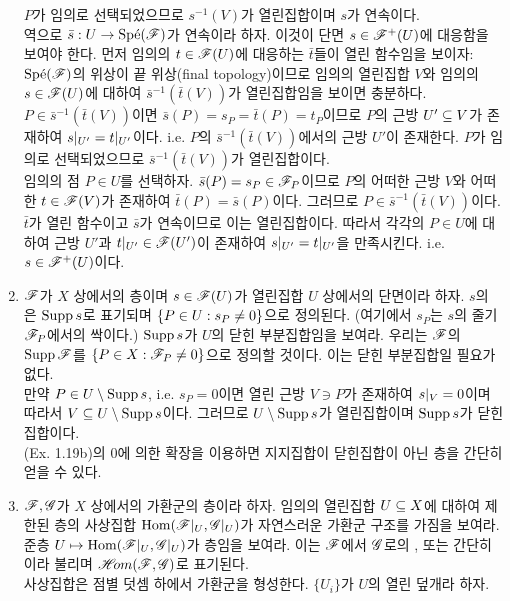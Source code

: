 \begin{enumerate}[label=\tb{1.\arabic*.},itemindent=0mm,itemsep=4mm]
	$P$가 임의로 선택되었으므로 $s^{-1}(V)$가 열린집합이며 $s$가 연속이다.\\
	역으로 $\bar s:U\rightarrow\text{Sp\'e}(\mathscr{F})$가 연속이라 하자. 이것이 단면 $s\in\mathscr{F}^+(U)$에 대응함을 보여야 한다.
	먼저 임의의 $t\in\mathscr{F}(U)$에 대응하는 $\bar t$들이 열린 함수임을 보이자:
	$\text{Sp\'e}(\mathscr{F})$의 위상이 끝 위상(final topology)이므로
	임의의 열린집합 $V$와 임의의 $s\in\mathscr{F}(U)$에 대하여 $\bar s^{-1}(\bar t(V))$가 열린집합임을 보이면 충분하다.
	$P\in\bar s^{-1}(\bar t(V))$이면 $\bar s(P)=s_P=\bar t(P)=t_P$이므로
	$P$의 근방 $U'\subseteq V$가 존재하여 $s|_{U'}=t|_{U'}$이다. i.e. $P$의 $\bar s^{-1}(\bar t(V))$에서의 근방 $U'$이 존재한다.
	$P$가 임의로 선택되었으므로 $\bar s^{-1}(\bar t(V))$가 열린집합이다.\\
	임의의 점 $P\in U$를 선택하자. $\bar s(P)=s_P\in\mathscr{F}_P$이므로 $P$의 어떠한 근방 $V$와 어떠한 $t\in\mathscr{F}(V)$가 존재하여
	$\bar t(P)=\bar s(P)$이다. 그러므로 $P\in\bar s^{-1}(\bar t(V))$이다.
	$\bar t$가 열린 함수이고 $\bar s$가 연속이므로 이는 열린집합이다.
	따라서 각각의 $P\in U$에 대하여 근방 $U'$과 $t|_{U'}\in\mathscr{F}(U')$이 존재하여 $s|_{U'}=t|_{U'}$을 만족시킨다.
	i.e. $s\in\mathscr{F}^+(U)$이다.
	\item {} $\mathscr{F}$가 $X$ 상에서의 층이며 $s\in\mathscr{F}(U)$가 열린집합 $U$ 상에서의 단면이라 하자.
	$s$의 은 $\operatorname{Supp} s$로 표기되며 $\{P\in U:s_P\ne 0\}$으로 정의된다.
	(여기에서 $s_P$는 $s$의 줄기 $\mathscr{F}_P$에서의 싹이다.) $\operatorname{Supp} s$가 $U$의 닫힌 부분집합임을 보여라.
	우리는 $\mathscr{F}$의  $\operatorname{Supp}\mathscr{F}$를 $\{P\in X:\mathscr{F}_P\ne 0\}$으로 정의할 것이다.
	이는 닫힌 부분집합일 필요가 없다.\\
	\sol 만약 $P\in U\setminus\operatorname{Supp} s$, i.e. $s_P=0$이면 열린 근방 $V\ni P$가 존재하여 $s|_V=0$이며 따라서 $V\subseteq U\setminus\operatorname{Supp} s$이다.
	그러므로 $U\setminus\operatorname{Supp} s$가 열린집합이며 $\operatorname{Supp} s$가 닫힌집합이다.\\
	(Ex. 1.19b)의 0에 의한 확장을 이용하면 지지집합이 닫힌집합이 아닌 층을 간단히 얻을 수 있다.
	\item {} $\mathscr{F},\mathscr{G}$가 $X$ 상에서의 가환군의 층이라 하자.
	임의의 열린집합 $U\subseteq X$에 대하여 제한된 층의 사상집합 $\operatorname{Hom}(\mathscr{F}|_U,\mathscr{G}|_U)$가
	자연스러운 가환군 구조를 가짐을 보여라. 준층 $U\mapsto\operatorname{Hom}(\mathscr{F}|_U,\mathscr{G}|_U)$가 층임을 보여라.
	이는 $\mathscr{F}$에서 $\mathscr{G}$로의 ,
	또는 간단히 이라 불리며 $\mathscr{H}\!om(\mathscr{F},\mathscr{G})$로 표기된다.\\
	\sol 사상집합은 점별 덧셈 하에서 가환군을 형성한다. $\{U_i\}$가 $U$의 열린 덮개라 하자.

\end{enumerate}
